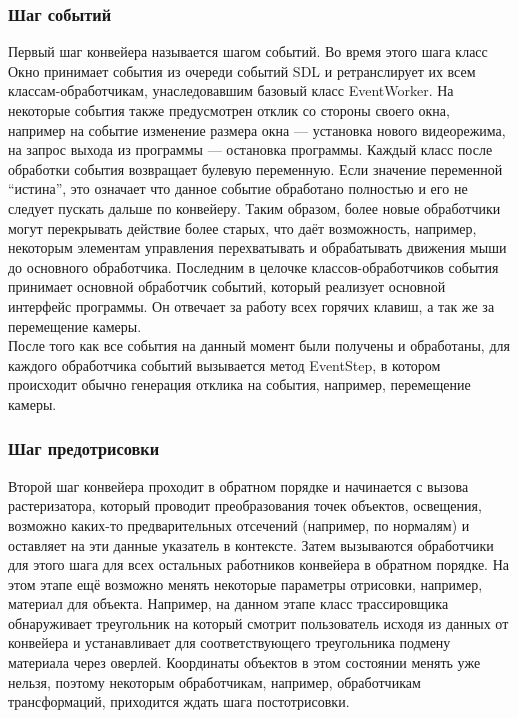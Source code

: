 \documentclass[a4paper,12pt]{report}
\numberwithin{equation}{section}
\begin{document}
\subsubsection{Шаг событий}
Первый шаг конвейера называется шагом событий. Во время этого шага класс Окно принимает события из очереди событий SDL и ретранслирует их всем классам-обработчикам, унаследовавшим базовый класс EventWorker. На некоторые события также предусмотрен отклик со стороны своего окна, например на событие изменение размера окна --- установка нового видеорежима, на запрос выхода из программы --- остановка программы. Каждый класс после обработки события возвращает булевую переменную. Если значение переменной ``истина'', это означает что данное событие обработано полностью и его не следует пускать дальше по конвейеру. Таким образом, более новые обработчики могут перекрывать действие более старых, что даёт возможность, например, некоторым элементам управления перехватывать и обрабатывать движения мыши до основного обработчика. Последним в целочке классов-обработчиков события принимает основной обработчик событий, который реализует основной интерфейс программы. Он отвечает за работу всех горячих клавиш, а так же за перемещение камеры. \\
После того как все события на данный момент были получены и обработаны, для каждого обработчика событий вызывается метод EventStep, в котором происходит обычно генерация отклика на события, например, перемещение камеры.

\subsubsection{Шаг предотрисовки}
Второй шаг конвейера проходит в обратном порядке и начинается с вызова растеризатора, который проводит преобразования точек объектов, освещения, возможно каких-то предварительных отсечений (например, по нормалям) и оставляет на эти данные указатель в контексте. Затем вызываются обработчики для этого шага для всех остальных работников конвейера в обратном порядке. На этом этапе ещё возможно менять некоторые параметры отрисовки, например, материал для объекта. Например, на данном этапе класс трассировщика обнаруживает треугольник на который смотрит пользователь исходя из данных от конвейера и устанавливает для соответствующего треугольника подмену материала через оверлей. Координаты объектов в этом состоянии менять уже нельзя, поэтому некоторым обработчикам, например, обработчикам трансформаций, приходится ждать шага постотрисовки.
\end{document}
